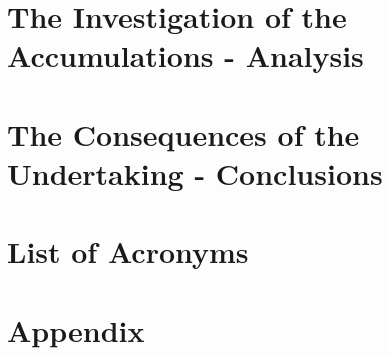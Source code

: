 \documentclass[british,11pt,a4paper]{memoir}
\begin{document}
\chapter{The Investigation of the Accumulations - Analysis}

\chapter{The Consequences of the Undertaking - Conclusions}


\chapter*{List of Acronyms}

\appendix
\chapter{Appendix}

\backmatter



\end{document}
